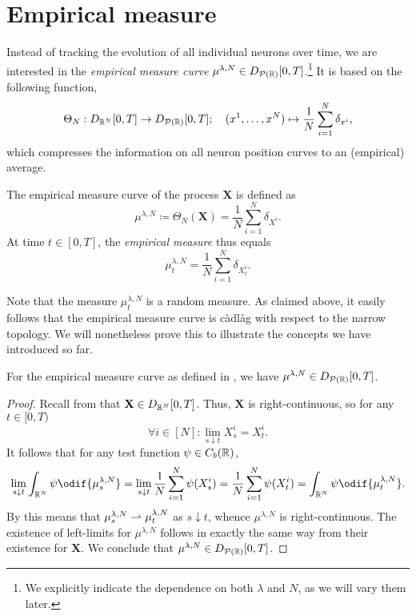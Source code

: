 \section{Empirical measure}

Instead of tracking the evolution of all individual neurons over time, we are interested in the \textit{empirical measure curve} \(\mu^{\lambda,N} \in D_{\mathcal{P}(\mathbb{R})}[0,T]\).\footnote{We explicitly indicate the dependence on both \(\lambda\) and \(N\), as we will vary them later.}
It is based on the following function,
\begin{equation}
  \Theta_N : D_{\mathbb{R}^N}[0,T] \to D_{\mathcal{P}(\mathbb{R})}[0,T]; \quad (x^1,\dots,x^N) \mapsto \frac{1}{N} \sum_{i=1}^N \delta_{x^i},
\end{equation}
which compresses the information on all neuron position curves to an (empirical) average.
\begin{definition}\label{def:emp-measure}
  The empirical measure curve of the process \(\bm{X}\) is defined as
  \begin{equation}
    \mu^{\lambda, N} \coloneqq \Theta_N(\bm{X}) = \frac{1}{N} \sum_{i=1}^N \delta_{X^i}.
  \end{equation}
  At time \(t \in [0,T]\), the \textit{empirical measure} thus equals
  \begin{equation}
    \mu_t^{\lambda, N} = \frac{1}{N} \sum_{i=1}^N \delta_{X_t^i}.
  \end{equation}
\end{definition}
Note that the measure \(\mu_t^{\lambda, N}\) is a random measure.
As claimed above, it easily follows that the empirical measure curve is càdlàg with respect to the narrow topology.
We will nonetheless prove this to illustrate the concepts we have introduced so far.
\begin{lemma}
  For the empirical measure curve as defined in , we have \(\mu^{\lambda,N} \in D_{\mathcal{P}(\mathbb{R})}[0,T]\).
\end{lemma}

\begin{proof}
  Recall from  that \(\mathbf{X} \in D_{\mathbb{R}^N}[0,T]\).
  Thus, \(\bm{X}\) is right-continuous, so for any \(t \in [0,T)\)
  \begin{equation}
    \forall i \in [N] : \lim_{s \downarrow t} X_s^i = X_t^i.
  \end{equation}
  It follows that for any test function \(\psi \in C_b(\mathbb{R})\),
  \begin{equation}
    \lim_{s \downarrow t} \int_{\potspace^N} \psi \odif{\mu_s^{\lambda, N}}
    = \lim_{s \downarrow t} \frac{1}{N} \sum_{i=1}^N \psi(X_s^i)
    = \frac{1}{N} \sum_{i=1}^N \psi(X_t^i)
    = \int_{\potspace^N} \psi \odif{\mu_t^{\lambda, N}}.
  \end{equation}
  By  this means that \(\mu_s^{\lambda, N} \rightharpoonup \mu_t^{\lambda, N}\) as \(s \downarrow t\), whence \(\mu^{\lambda,N}\) is right-continuous.
  The existence of left-limits for \(\mu^{\lambda,N}\) follows in exactly the same way from their existence for \(\bm{X}\).
  We conclude that \(\mu^{\lambda,N} \in D_{\mathcal{P}(\mathbb{R})}[0,T]\).
\end{proof}

